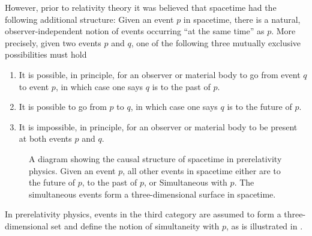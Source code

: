 However, prior to relativity theory it was believed that spacetime had the following additional structure: Given an event $p$ in spacetime, there is a natural, observer-independent notion of events occurring “at the same time'' as $p$. More precisely, given two events $p$ and $q$, one of the following three mutually exclusive possibilities must hold
\begin{enumerate}[label=(\arabic*)]
    \item It is possible, in principle, for an observer or material body to go from event $q$ to event $p$, in which case one says $q$ is to the past of $p$.
    \item It is possible to go from $p$ to $q$, in which case one says $q$ is to the future of $p$.
    \item It is impossible, in principle, for an observer or material body to be present at both events $p$ and $q$.
\end{enumerate}

\begin{figure}[!ht]
\begin{minipage}{.6\textwidth}
    \centering
\end{minipage}
\hfill
\begin{minipage}{.32\textwidth}
    \caption{A diagram showing the causal structure of spacetime in prerelativity physics. Given an event $p$, all other events in spacetime either are to the future of $p$, to the past of $p$, or Simultaneous with $p$. The simultaneous events form a three-dimensional surface in spacetime.}
    \label{1.1}
\end{minipage}
\end{figure}

In prerelativity physics, events in the third category are assumed to form a three-dimensional set and define the notion of simultaneity with $p$, as is illustrated in .


